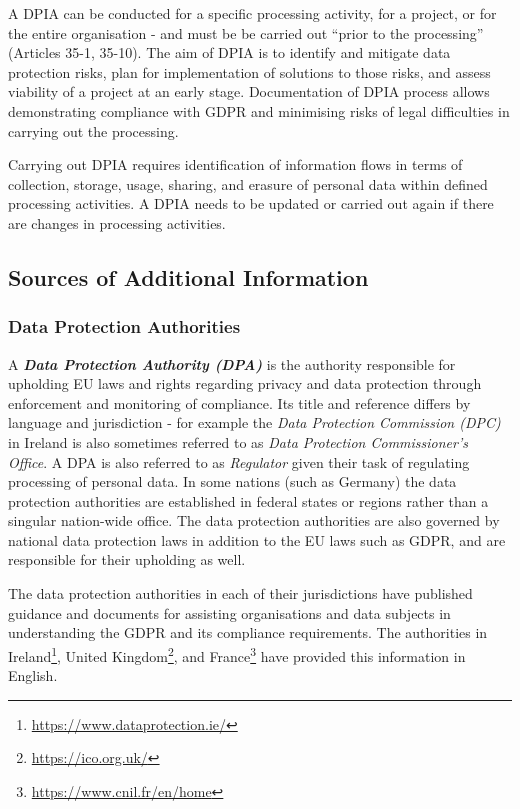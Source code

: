 A DPIA can be conducted for a specific processing activity, for a project, or for the entire organisation - and must be be carried out ``prior to the processing'' (Articles 35-1, 35-10).
The aim of DPIA is to identify and mitigate data protection risks, plan for implementation of solutions to those risks, and assess viability of a project at an early stage.
Documentation of DPIA process allows demonstrating compliance with GDPR and minimising risks of legal difficulties in carrying out the processing.

Carrying out DPIA requires identification of information flows in terms of collection, storage, usage, sharing, and erasure of personal data within defined processing activities. A DPIA needs to be updated or carried out again if there are changes in processing activities.

\subsection{Sources of Additional Information}

\subsubsection{Data Protection Authorities}
A \textit{\textbf{Data Protection Authority (DPA)}} is the authority responsible for upholding EU laws and rights regarding privacy and data protection through enforcement and monitoring of compliance.
Its title and reference differs by language and jurisdiction - for example the \textit{Data Protection Commission (DPC)} in Ireland is also sometimes referred to as \textit{Data Protection Commissioner's Office}. 
A DPA is also referred to as \textit{Regulator} given their task of regulating processing of personal data.
In some nations (such as Germany) the data protection authorities are established in federal states or regions rather than a singular nation-wide office. The data protection authorities are also governed by national data protection laws in addition to the EU laws such as GDPR, and are responsible for their upholding as well.

The data protection authorities in each of their jurisdictions have published guidance and documents for assisting organisations and data subjects in understanding the GDPR and its compliance requirements. The authorities in Ireland\footnote{\url{https://www.dataprotection.ie/}}, United Kingdom\footnote{\url{https://ico.org.uk/}}, and France\footnote{\url{https://www.cnil.fr/en/home}} have provided this information in English.

